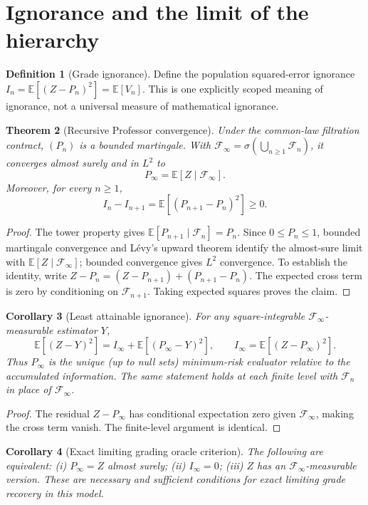 \documentclass[11pt,letterpaper]{article}
\newtheorem{theorem}{Theorem}[section]
\newtheorem{corollary}[theorem]{Corollary}
\theoremstyle{definition}\newtheorem{definition}[theorem]{Definition}\newtheorem{example}[theorem]{Example}\newtheorem{conjecture}[theorem]{Conjecture}
\newcommand{\E}{\mathbb E}\newcommand{\PP}{\mathbb P}\newcommand{\F}{\mathcal F}\newcommand{\Var}{\operatorname{Var}}\newcommand{\PC}{\operatorname{PC}}\newcommand{\N}{\mathbb N}
\begin{document}
\section{Ignorance and the limit of the hierarchy}
\begin{definition}[Grade ignorance]
Define the population squared-error ignorance $I_n=\E[(Z-P_n)^2]=\E[V_n]$. This is one explicitly scoped meaning of ignorance, not a universal measure of mathematical ignorance.
\end{definition}
\begin{theorem}[Recursive Professor convergence]\label{thm:convergence}
Under the common-law filtration contract, $(P_n)$ is a bounded martingale. With $\F_\infty=\sigma(\bigcup_{n\geq1}\F_n)$, it converges almost surely and in $L^2$ to
\[
 P_\infty=\E[Z\mid\F_\infty].
\]
Moreover, for every $n\geq1$,
\begin{equation}\label{eq:ignorance}
 I_n-I_{n+1}=\E[(P_{n+1}-P_n)^2]\geq0.
\end{equation}
\end{theorem}
\begin{proof}
The tower property gives $\E[P_{n+1}\mid\F_n]=P_n$. Since $0\leq P_n\leq1$, bounded martingale convergence and L\'evy's upward theorem \cite{williams} identify the almost-sure limit with $\E[Z\mid\F_\infty]$; bounded convergence gives $L^2$ convergence. To establish the identity, write $Z-P_n=(Z-P_{n+1})+(P_{n+1}-P_n)$. The expected cross term is zero by conditioning on $\F_{n+1}$. Taking expected squares proves the claim.
\end{proof}
\begin{corollary}[Least attainable ignorance]\label{cor:optimal}
For any square-integrable $\F_\infty$-measurable estimator $Y$,
\[
 \E[(Z-Y)^2]=I_\infty+\E[(P_\infty-Y)^2],\qquad I_\infty=\E[(Z-P_\infty)^2].
\]
Thus $P_\infty$ is the unique (up to null sets) minimum-risk evaluator relative to the accumulated information. The same statement holds at each finite level with $\F_n$ in place of $\F_\infty$.
\end{corollary}
\begin{proof}The residual $Z-P_\infty$ has conditional expectation zero given $\F_\infty$, making the cross term vanish. The finite-level argument is identical.\end{proof}
\begin{corollary}[Exact limiting grading oracle criterion]\label{cor:exact}
The following are equivalent: (i) $P_\infty=Z$ almost surely; (ii) $I_\infty=0$; (iii) $Z$ has an $\F_\infty$-measurable version. These are necessary and sufficient conditions for exact limiting grade recovery in this model.
\end{corollary}
\end{document}

